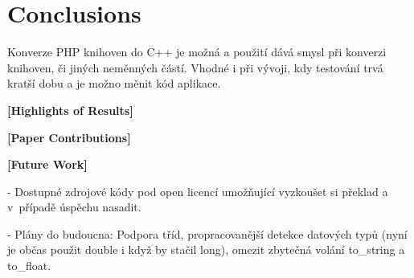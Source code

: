 \documentclass[czech]{ExcelAtFIT}
\begin{document}








\section{Conclusions}
\label{sec:Conclusions}


	Konverze PHP knihoven do C++ je možná a použití dává smysl při konverzi knihoven, či jiných neměnných částí. Vhodné i při vývoji, kdy testování trvá kratší dobu a je možno měnit kód aplikace.


\textbf{[Highlights of Results]} 


\textbf{[Paper Contributions]} 


\textbf{[Future Work]} 

- Dostupné zdrojové kódy pod open licencí  umožňující vyzkoušet si překlad a v~případě úspěchu nasadit.

- Plány do budoucna: Podpora tříd, propracovanější detekce datových typů (nyní je občas použit double i když by stačil long), omezit zbytečná volání to\_string a to\_float.





\end{document}
